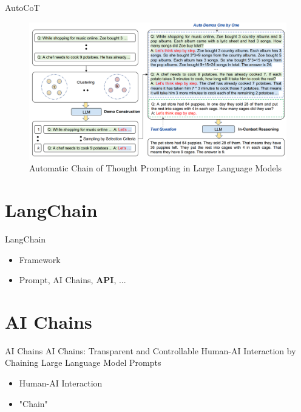 \documentclass{beamer}
\begin{document}
\begin{frame}{AutoCoT}
    \begin{figure}[c]
        \centering
        \includegraphics[height=.7\textheight]{pic/7.png}
        \caption{Automatic Chain of Thought Prompting in Large Language Models}
    \end{figure}
\end{frame}

\section{LangChain}

\begin{frame}{LangChain}
    \begin{itemize}
        \item Framework
        \item Prompt, AI Chains, \textbf{API}, ...
    \end{itemize}
\end{frame}

\section{AI Chains}

\begin{frame}{AI Chains}
    AI Chains: Transparent and Controllable Human-AI Interaction by Chaining Large Language Model Prompts
    \begin{itemize}
        \item Human-AI Interaction
        \item "Chain"
    \end{itemize}
\end{frame}
\end{document}

